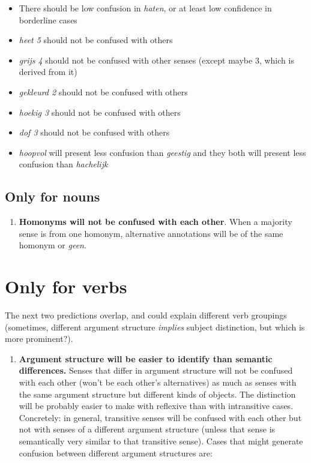 \documentclass[
]{book}
\providecommand{\tightlist}{%
  \setlength{\itemsep}{0pt}\setlength{\parskip}{0pt}}
\begin{document}
\begin{itemize}
\tightlist
\item
  There should be low confusion in \emph{haten}, or at least low confidence in borderline cases
\item
  \emph{heet 5} should not be confused with others
\item
  \emph{grijs 4} should not be confused with other senses (except maybe 3, which is derived from it)
\item
  \emph{gekleurd 2} should not be confused with others
\item
  \emph{hoekig 3} should not be confused with others
\item
  \emph{dof 3} should not be confused with others
\item
  \emph{hoopvol} will present less confusion than \emph{geestig} and they both will present less confusion than \emph{hachelijk}
\end{itemize}

\hypertarget{only-for-nouns}{%
\subsection{Only for nouns}\label{only-for-nouns}}

\begin{enumerate}
\def\labelenumi{\arabic{enumi}.}
\setcounter{enumi}{3}
\tightlist
\item
  \textbf{Homonyms will not be confused with each other}.
  When a majority sense is from one homonym, alternative annotations will be of the same homonym or \emph{geen}.
\end{enumerate}

\hypertarget{only-for-verbs}{%
\section{Only for verbs}\label{only-for-verbs}}

The next two predictions overlap, and could explain different verb groupings (sometimes, different argument structure \emph{implies} subject distinction, but which is more prominent?).

\begin{enumerate}
\def\labelenumi{\arabic{enumi}.}
\setcounter{enumi}{4}
\tightlist
\item
  \textbf{Argument structure will be easier to identify than semantic differences.}
  Senses that differ in argument structure will not be confused with each other (won't be each other's alternatives) as much as senses with the same argument structure but different kinds of objects. The distinction will be probably easier to make with reflexive than with intransitive cases.
  Concretely: in general, transitive senses will be confused with each other but not with senses of a different argument structure (unless that sense is semantically very similar to that transitive sense). Cases that might generate confusion between different argument structures are:
\end{enumerate}
\end{document}
